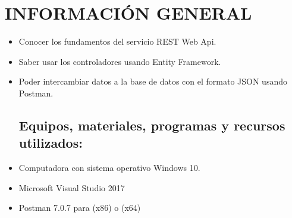 \section{INFORMACIÓN GENERAL} 

\begin{itemize}
\subsection{Objetivos:}
	\item Conocer los fundamentos del servicio REST Web Api.
	\item Saber usar los controladores usando Entity Framework.
	\item Poder intercambiar datos a la base de datos con el formato JSON usando Postman.

\subsection{Equipos, materiales, programas y recursos utilizados:}
	\item Computadora con sistema operativo Windows 10.
	\item Microsoft Visual Studio 2017
	\item Postman 7.0.7 para (x86) o (x64)


\end{itemize}